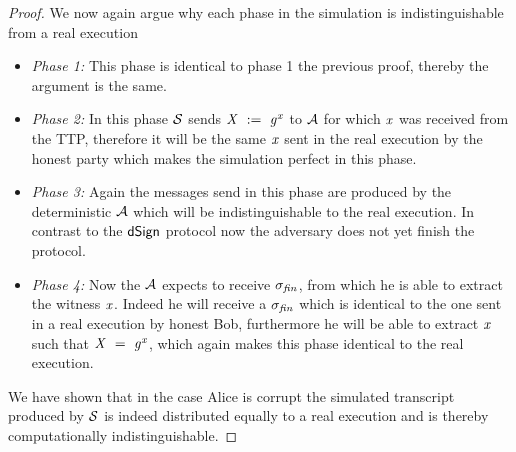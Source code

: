 \begin{proof}
    We now again argue why each phase in the simulation is indistinguishable from a real execution
    \begin{itemize}
        \item \textit{Phase 1:} This phase is identical to phase 1 the previous proof, thereby the argument is the same. 
        \item \textit{Phase 2:} In this phase $\mathcal{S}$ sends $\mathit{X} ~:=~ \mathit{g}^{\mathit{x}}$ to $\mathcal{A}$ for which $\mathit{x}$ was received from the TTP, therefore it will be the same $\mathit{x}$ sent in the real execution by the honest party which makes the simulation perfect in this phase.
        \item \textit{Phase 3:} Again the messages send in this phase are produced by the deterministic $\mathcal{A}$ which will be indistinguishable to the real execution.
        In contrast to the $\mathsf{dSign}$ protocol now the adversary does not yet finish the protocol.
        \item \textit{Phase 4:} Now the $\mathcal{A}$ expects to receive $\sigma_{\mathit{fin}}$, from which he is able to extract the witness $\mathit{x}$.
        Indeed he will receive a $\sigma_{\mathit{fin}}$ which is identical to the one sent in a real execution by honest Bob, furthermore he will be able to extract $\mathit{x}$ such that $\mathit{X} ~=~ \mathit{g}^{\mathit{x}}$, which again makes this phase identical to the real execution.
    \end{itemize}


    We have shown that in the case Alice is corrupt the simulated transcript produced by $\mathcal{S}$ is indeed distributed equally to a real execution and is thereby computationally indistinguishable.


\end{proof}
